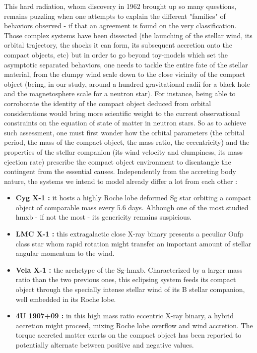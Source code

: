 \documentclass[
    a4paper, 
    12pt, onecolumn,
]{article}
\begin{document}
\indent This hard radiation, whom discovery in 1962 \citep{Giacconi1962} brought up so many questions, remains puzzling when one attempts to explain the different "families" of behaviors observed - if that an agreement is found on the very classification. Those complex systems have been dissected (the launching of the stellar wind, its orbital trajectory, the shocks it can form, its subsequent accretion onto the compact objects, etc) but in order to go beyond toy-models which set the asymptotic separated behaviors, one needs to tackle the entire fate of the stellar material, from the clumpy wind scale down to the close vicinity of the compact object (being, in our study, around a hundred gravitational radii for a black hole and the magnetosphere scale for a neutron star). For instance, being able to corroborate the identity of the compact object deduced from orbital considerations would bring more scientific weight to the current observational constraints on the equation of state of matter in neutron stars. So as to achieve such assessment, one must first wonder how the orbital parameters (the orbital period, the mass of the compact object, the mass ratio, the eccentricity) and the properties of the stellar companion (its wind velocity and clumpiness, its mass ejection rate) prescribe the compact object environment to disentangle the contingent from the essential causes. Independently from the accreting body nature, the systems we intend to model already differ a lot from each other :\\
\begin{itemize}
\item \textbf{Cyg X-1 :} it hosts a highly R{\sc oche} lobe deformed \citep{Avni1975} Sg star \citep{Shenavrin2011} orbiting a compact object of comparable mass every 5.6 days. Although one of the most studied {\sc hmxb} - if not the most - its genericity remains suspicious.\\
\item \textbf{LMC X-1 :} this extragalactic close X-ray binary presents a peculiar Onfp class \citep{Walborn2010} star whom rapid rotation might transfer an important amount of stellar angular momentum to the wind. \\
\item \textbf{Vela X-1 :} the archetype of the Sg-{\sc hmxb}. Characterized by a larger mass ratio than the two previous ones, this eclipsing system feeds its compact object through the specially intense stellar wind of its B stellar companion, well embedded in its R{\sc oche} lobe.\\
\item \textbf{4U 1907+09 :} in this high mass ratio eccentric X-ray binary, a hybrid accretion might proceed, mixing R{\sc oche} lobe overflow and wind accretion. The torque accreted matter exerts on the compact object has been reported to potentially alternate between positive and negative values.\\
\end{itemize}
\end{document}
